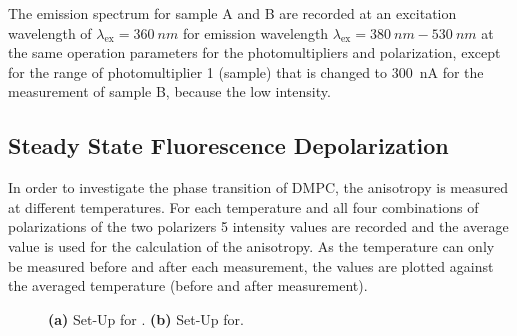 \documentclass{scrartcl}
\numberwithin{equation}{section}
\numberwithin{figure}{section}
\numberwithin{table}{section}
\begin{document}
The emission spectrum for sample A and B are recorded at an excitation wavelength of $\lambda_\text{ex}=\SI{360}{nm}$ for emission wavelength $\lambda_\text{ex}=\SI{380}{nm} - \SI{530}{nm}$ at the same operation parameters for the photomultipliers and polarization, except for the range of photomultiplier 1 (sample) that is changed to \SI{300}{nA} for the measurement of sample B, because the low intensity.

\subsection{Steady State Fluorescence Depolarization}
In order to investigate the phase transition of DMPC, the anisotropy is measured at different temperatures. For each temperature and all four combinations of polarizations of the two polarizers 5 intensity values are recorded and the average value is used for the calculation of the anisotropy. As the temperature can only be measured before and after each measurement, the  values are plotted against the averaged temperature (before and after measurement).


\begin{figure}
\centering
{}
\hfill
{}
\caption{ \small \textbf{(a)} Set-Up for . \textbf{(b)} Set-Up for.}
\label{fig:setup}
\end{figure}
\end{document}
